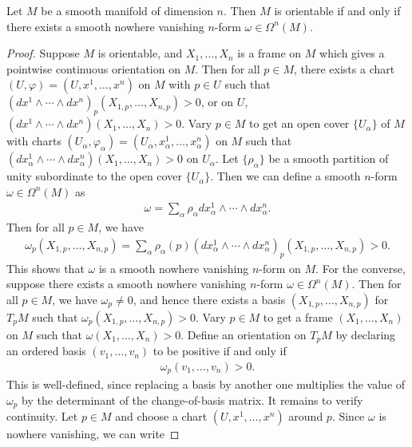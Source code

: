 \begin{proposition}
    Let $M$ be a smooth manifold of dimension $n$. Then $M$ is orientable if and only if there exists a smooth nowhere vanishing $n$-form $\omega \in \Omega^{n}(M)$.
\end{proposition}
\begin{proof}
    Suppose $M$ is orientable, and $X_{1},\ldots,X_{n}$ is a frame on $M$ which gives a pointwise continuous orientation on $M$. Then for all $p \in M$, there exists a chart $(U,\varphi) = (U,x^{1},\ldots,x^{n})$ on $M$ with $p \in U$ such that $(dx^{1} \wedge \cdots \wedge dx^{n})_{p}(X_{1,p},\ldots,X_{n,p}) > 0$, or on $U$, $(dx^{1} \wedge \cdots \wedge dx^{n})(X_{1},\ldots,X_{n}) > 0$. Vary $p \in M$ to get an open cover $\{U_{\alpha}\}$ of $M$ with charts $(U_{\alpha},\varphi_{\alpha}) = (U_{\alpha},x^{1}_{\alpha},\ldots,x^{n}_{\alpha})$ on $M$ such that $(dx^{1}_{\alpha} \wedge \cdots \wedge dx^{n}_{\alpha})(X_{1},\ldots,X_{n}) > 0$ on $U_{\alpha}$. Let $\{\rho_{\alpha}\}$ be a smooth partition of unity subordinate to the open cover $\{U_{\alpha}\}$. Then we can define a smooth $n$-form $\omega \in \Omega^{n}(M)$ as
    \begin{align}
        \omega = \sum_{\alpha} \rho_{\alpha} dx^{1}_{\alpha} \wedge \cdots \wedge dx^{n}_{\alpha}.
    \end{align}
    Then for all $p \in M$, we have
    \begin{align}
        \omega_p(X_{1,p},\ldots,X_{n,p}) = \sum_{\alpha} \rho_{\alpha}(p) (dx^{1}_{\alpha} \wedge \cdots \wedge dx^{n}_{\alpha})_p(X_{1,p},\ldots,X_{n,p}) > 0.
    \end{align}
    This shows that $\omega$ is a smooth nowhere vanishing $n$-form on $M$. For the converse, suppose there exists a smooth nowhere vanishing $n$-form $\omega \in \Omega^{n}(M)$. Then for all $p \in M$, we have $\omega_{p} \neq 0$, and hence there exists a basis $(X_{1,p},\ldots,X_{n,p})$ for $T_{p}M$ such that $\omega_{p}(X_{1,p},\ldots,X_{n,p}) > 0$. Vary $p \in M$ to get a frame $(X_{1},\ldots,X_{n})$ on $M$ such that $\omega(X_{1},\ldots,X_{n}) > 0$. 
    Define an orientation on $T_{p}M$ by declaring an ordered basis $(v_{1},\ldots,v_{n})$ to be positive if and only if
    \begin{align}
        \omega_{p}(v_{1},\ldots,v_{n}) > 0.
    \end{align}
    This is well-defined, since replacing a basis by another one multiplies the value of $\omega_{p}$ by the determinant of the change-of-basis matrix. It remains to verify continuity. Let $p \in M$ and choose a chart $(U,x^{1},\ldots,x^{n})$ around $p$. Since $\omega$ is nowhere vanishing, we can write

\end{proof}
